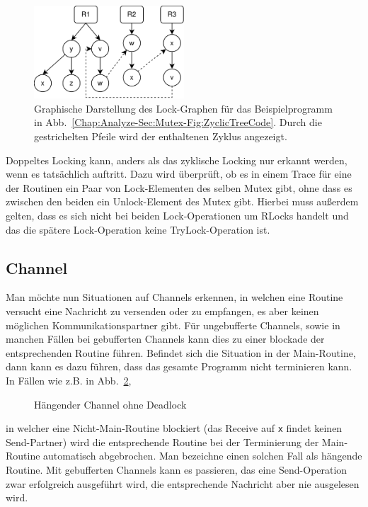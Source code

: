 \begin{figure}[h!]
  \centering
  \includegraphics[width=0.5\textwidth]{img/tree_example.eps}
  \caption{Graphische Darstellung des Lock-Graphen für das Beispielprogramm in 
    Abb.~\ref{Chap:Analyze-Sec:Mutex-Fig:ZyclicTreeCode}. Durch die gestrichelten 
    Pfeile wird der enthaltenen Zyklus angezeigt.}
    \label{Chap:Analyze-Sec:Mutex-Fig:ZyclicTreeImg}
\end{figure}
Doppeltes Locking kann, anders als das zyklische Locking nur erkannt werden, 
wenn es tatsächlich auftritt. Dazu wird überprüft, ob es in einem Trace 
für eine der Routinen ein Paar von Lock-Elementen des selben Mutex gibt, 
ohne dass es zwischen den beiden ein Unlock-Element des Mutex gibt. 
Hierbei muss außerdem gelten, dass es sich nicht bei beiden Lock-Operationen 
um RLocks handelt und das die spätere Lock-Operation keine TryLock-Operation ist.  



\subsection{Channel}\label{Chap:Theo-Sec:Analyze-SubSec:Channel}
Man möchte nun Situationen auf Channels erkennen, in welchen eine 
Routine versucht eine Nachricht zu versenden oder zu empfangen, es aber 
keinen möglichen Kommunikationspartner gibt. Für ungebufferte 
Channels, sowie in manchen Fällen bei gebufferten Channels kann dies zu einer 
blockade der entsprechenden Routine führen. Befindet sich die Situation in 
der Main-Routine, dann kann es dazu führen, dass das gesamte Programm 
nicht terminieren kann. In Fällen wie z.B. in 
Abb.~\ref{Chap:Analyze-Sec:Channel-SubSec:Dangling-Fig:ExDanglingWithout}, 
\begin{figure}[h!]
  
  \caption{Hängender Channel ohne Deadlock}
  \label{Chap:Analyze-Sec:Channel-SubSec:Dangling-Fig:ExDanglingWithout}
\end{figure}
in welcher eine Nicht-Main-Routine blockiert (das Receive auf \texttt{x} findet 
keinen Send-Partner) wird die entsprechende Routine bei der Terminierung 
der Main-Routine automatisch abgebrochen. Man bezeichne einen solchen Fall 
als hängende Routine. Mit gebufferten Channels kann es passieren, 
das eine Send-Operation zwar erfolgreich ausgeführt wird, die entsprechende
Nachricht aber nie ausgelesen wird.

